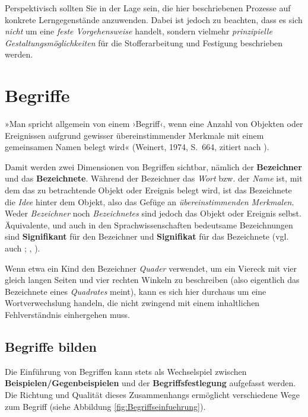 \documentclass[
]{scrbook}
\theoremstyle{definition}
\theoremstyle{definition}
\theoremstyle{definition}
\theoremstyle{definition}
\theoremstyle{remark}
\begin{document}
Perspektivisch sollten Sie in der Lage sein, die hier beschriebenen Prozesse auf konkrete Lerngegenstände anzuwenden. Dabei ist jedoch zu beachten, dass es sich \emph{nicht} um eine \emph{feste Vorgehensweise} handelt, sondern vielmehr \emph{prinzipielle Gestaltungsmöglichkeiten} für die Stofferarbeitung und Festigung beschrieben werden.

\section{Begriffe}\label{begriffe}

»Man spricht allgemein von einem ›Begriff‹, wenn eine Anzahl von Objekten oder Ereignissen aufgrund gewisser übereinstimmender Merkmale mit einem gemeinsamen Namen belegt wird« (Weinert, 1974, S.~664, zitiert nach ).

Damit werden zwei Dimensionen von Begriffen sichtbar, nämlich der \textbf{Bezeichner} und das \textbf{Bezeichnete}. Während der Bezeichner das \emph{Wort} bzw. der \emph{Name} ist, mit dem das zu betrachtende Objekt oder Ereignis belegt wird, ist das Bezeichnete die \emph{Idee} hinter dem Objekt, also das Gefüge an \emph{übereinstimmenden Merkmalen}. Weder \emph{Bezeichner} noch \emph{Bezeichnetes} sind jedoch das Objekt oder Ereignis selbst.
Äquivalente, und auch in den Sprachwissenschaften bedeutsame Bezeichnungen sind \textbf{Signifikant} für den Bezeichner und \textbf{Signifikat} für das Bezeichnete (vgl. auch ; , ).

Wenn etwa ein Kind den Bezeichner \emph{Quader} verwendet, um ein Viereck mit vier gleich langen Seiten und vier rechten Winkeln zu beschreiben (also eigentlich das Bezeichnete eines \emph{Quadrates} meint), kann es sich hier durchaus um eine Wortverwechslung handeln, die nicht zwingend mit einem inhaltlichen Fehlverständnis einhergehen muss.

\subsection{Begriffe bilden}\label{begriffe-bilden}

Die Einführung von Begriffen kann stets als Wechselspiel zwischen \textbf{Beispielen/Gegenbeispielen} und der \textbf{Begriffsfestlegung} aufgefasst werden. Die Richtung und Qualität dieses Zusammenhangs ermöglicht verschiedene Wege zum Begriff (siehe Abbildung \ref{fig:Begriffseinfuehrung}).
\end{document}
